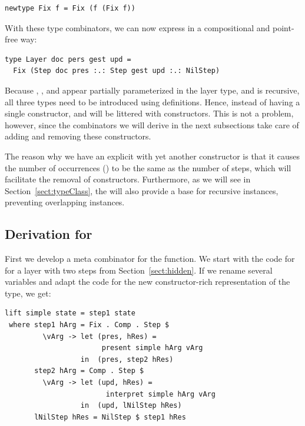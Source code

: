 \documentclass[preprint,natbib]{sigplanconf}
\begin{document}
\begin{small}
\begin{verbatim}
newtype Fix f = Fix (f (Fix f))
\end{verbatim}
\end{small}

With these type combinators, we can now express  in a compositional and point-free way:

\begin{small}
\begin{verbatim}
type Layer doc pers gest upd = 
  Fix (Step doc pres :.: Step gest upd :.: NilStep)
\end{verbatim}
\end{small}

Because , , and   appear partially parameterized in the layer type, and  is recursive, all three types need to be introduced using  definitions. Hence, instead of having a single  constructor,  and  will be littered with constructors. This is not a problem, however, since the combinators we will derive in the next subsections take care of adding and removing these constructors.

The reason why we have an explicit  with yet another constructor is that it causes the number of occurrences () to be the same as the number of steps, which will facilitate the removal of  constructors. Furthermore, as we will see in Section~\ref{sect:typeClass}, the  will also provide a base for recursive instances, preventing overlapping instances.


%																
\subsection{Derivation for }\label{subsect:liftDerivation}

First we develop a meta combinator for the  function. We start with the code for  for a layer with two steps from Section~\ref{sect:hidden}. If we rename several variables and adapt the code for the new constructor-rich representation of the  type, we get:


\begin{small} %
\begin{verbatim}
lift simple state = step1 state 
 where step1 hArg = Fix . Comp . Step $
         \vArg -> let (pres, hRes) = 
                       present simple hArg vArg
                  in  (pres, step2 hRes)
       step2 hArg = Comp . Step $
         \vArg -> let (upd, hRes) = 
                        interpret simple hArg vArg
                  in  (upd, lNilStep hRes)
       lNilStep hRes = NilStep $ step1 hRes
\end{verbatim}%
\end{small}
\end{document}
